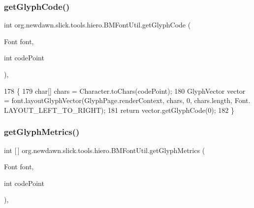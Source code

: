\subsubsection{\texorpdfstring{get\+Glyph\+Code()}{getGlyphCode()}}
{\footnotesize\ttfamily int org.\+newdawn.\+slick.\+tools.\+hiero.\+B\+M\+Font\+Util.\+get\+Glyph\+Code (\begin{DoxyParamCaption}\item[{Font}]{font,  }\item[{int}]{code\+Point }\end{DoxyParamCaption})\hspace{0.3cm}{\ttfamily [inline]}, {\ttfamily [private]}}


\begin{DoxyCode}
178                                                         \{
179         \textcolor{keywordtype}{char}[] chars = Character.toChars(codePoint);
180         GlyphVector vector = font.layoutGlyphVector(GlyphPage.renderContext, chars, 0, chars.length, Font.
      LAYOUT\_LEFT\_TO\_RIGHT);
181         \textcolor{keywordflow}{return} vector.getGlyphCode(0);
182     \}
\end{DoxyCode}
\mbox{\label{classorg_1_1newdawn_1_1slick_1_1tools_1_1hiero_1_1_b_m_font_util_a103b65a81fd522188bc0fd1401fd13f5}} 
\subsubsection{\texorpdfstring{get\+Glyph\+Metrics()}{getGlyphMetrics()}}
{\footnotesize\ttfamily int \mbox{[}$\,$\mbox{]} org.\+newdawn.\+slick.\+tools.\+hiero.\+B\+M\+Font\+Util.\+get\+Glyph\+Metrics (\begin{DoxyParamCaption}\item[{Font}]{font,  }\item[{int}]{code\+Point }\end{DoxyParamCaption})\hspace{0.3cm}{\ttfamily [inline]}, {\ttfamily [private]}}


